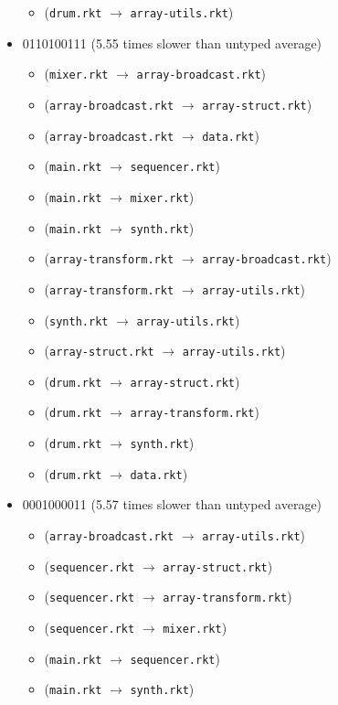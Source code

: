 \documentclass{article}
\newcommand{\mono}[1]{\texttt{#1}}
\begin{document}
\begin{itemize}
\begin{itemize}
  \item (\mono{drum.rkt} $\rightarrow$ \mono{array-utils.rkt})
  \end{itemize}
\item 0110100111 (5.55 times slower than untyped average)
  \begin{itemize}
  \item (\mono{mixer.rkt} $\rightarrow$ \mono{array-broadcast.rkt})
  \item (\mono{array-broadcast.rkt} $\rightarrow$ \mono{array-struct.rkt})
  \item (\mono{array-broadcast.rkt} $\rightarrow$ \mono{data.rkt})
  \item (\mono{main.rkt} $\rightarrow$ \mono{sequencer.rkt})
  \item (\mono{main.rkt} $\rightarrow$ \mono{mixer.rkt})
  \item (\mono{main.rkt} $\rightarrow$ \mono{synth.rkt})
  \item (\mono{array-transform.rkt} $\rightarrow$ \mono{array-broadcast.rkt})
  \item (\mono{array-transform.rkt} $\rightarrow$ \mono{array-utils.rkt})
  \item (\mono{synth.rkt} $\rightarrow$ \mono{array-utils.rkt})
  \item (\mono{array-struct.rkt} $\rightarrow$ \mono{array-utils.rkt})
  \item (\mono{drum.rkt} $\rightarrow$ \mono{array-struct.rkt})
  \item (\mono{drum.rkt} $\rightarrow$ \mono{array-transform.rkt})
  \item (\mono{drum.rkt} $\rightarrow$ \mono{synth.rkt})
  \item (\mono{drum.rkt} $\rightarrow$ \mono{data.rkt})
  \end{itemize}
\item 0001000011 (5.57 times slower than untyped average)
  \begin{itemize}
  \item (\mono{array-broadcast.rkt} $\rightarrow$ \mono{array-utils.rkt})
  \item (\mono{sequencer.rkt} $\rightarrow$ \mono{array-struct.rkt})
  \item (\mono{sequencer.rkt} $\rightarrow$ \mono{array-transform.rkt})
  \item (\mono{sequencer.rkt} $\rightarrow$ \mono{mixer.rkt})
  \item (\mono{main.rkt} $\rightarrow$ \mono{sequencer.rkt})
  \item (\mono{main.rkt} $\rightarrow$ \mono{synth.rkt})

\end{itemize}
\end{itemize}
\end{document}
